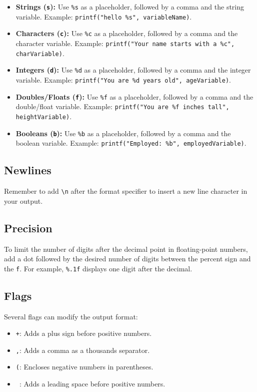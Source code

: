 \documentclass{article}
\begin{document}
\begin{itemize}
    \item \textbf{Strings (\texttt{s}):}  Use \texttt{\%s} as a placeholder, followed by a comma and the string variable. Example: \texttt{printf("hello \%s", variableName)}.
    \item \textbf{Characters (\texttt{c}):} Use \texttt{\%c} as a placeholder, followed by a comma and the character variable. Example: \texttt{printf("Your name starts with a \%c", charVariable)}.
    \item \textbf{Integers (\texttt{d}):} Use \texttt{\%d} as a placeholder, followed by a comma and the integer variable. Example: \texttt{printf("You are \%d years old", ageVariable)}.
    \item \textbf{Doubles/Floats (\texttt{f}):} Use \texttt{\%f} as a placeholder, followed by a comma and the double/float variable. Example: \texttt{printf("You are \%f inches tall", heightVariable)}.
    \item \textbf{Booleans (\texttt{b}):} Use \texttt{\%b} as a placeholder, followed by a comma and the boolean variable. Example: \texttt{printf("Employed: \%b", employedVariable)}.
\end{itemize}

\subsection{Newlines}

Remember to add \texttt{\textbackslash{}n} after the format specifier to insert a new line character in your output.

\subsection{Precision}

To limit the number of digits after the decimal point in floating-point numbers, add a dot followed by the desired number of digits between the percent sign and the \texttt{f}. For example, \texttt{\%.1f} displays one digit after the decimal.

\subsection{Flags}

Several flags can modify the output format:

\begin{itemize}
    \item \texttt{+}: Adds a plus sign before positive numbers.
    \item \texttt{,}: Adds a comma as a thousands separator.
    \item \texttt{(}: Encloses negative numbers in parentheses.
    \item \texttt{ }: Adds a leading space before positive numbers.
\end{itemize}
\end{document}
